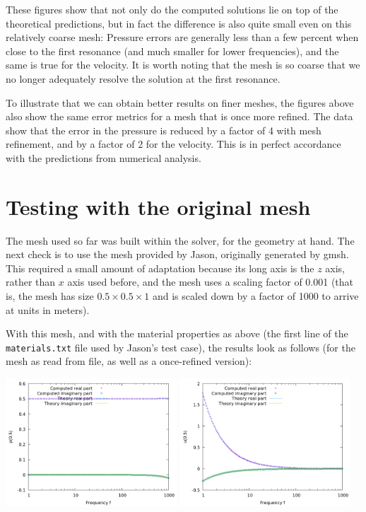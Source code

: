\documentclass{article}
\begin{document}
These figures show that not only do the computed solutions lie on top
of the theoretical predictions, but in fact the difference is also
quite small even on this relatively coarse mesh: Pressure errors are
generally less than a few percent when close to the first resonance
(and much smaller for lower frequencies), and the
same is true for the velocity. It is worth noting that the mesh is so
coarse that we no longer adequately resolve the solution at the first
resonance.

To illustrate that we can obtain better results on finer meshes, the
figures above also show the same error metrics for a mesh that is once
more refined. The data show that the error in the pressure is reduced
by a factor of 4 with mesh refinement, and by a factor of 2 for the
velocity. This is in perfect accordance with the predictions from
numerical analysis.


\section{Testing with the original mesh}

The mesh used so far was built within the solver, for the geometry at
hand. The next check is to use the mesh provided by Jason, originally
generated by gmsh. This required a small amount of adaptation because
its long axis is the $z$ axis, rather than $x$ axis used before, and
the mesh uses a scaling factor of 0.001 (that is, the mesh has size
$0.5\times 0.5\times 1$ and is scaled down by a factor of 1000 to
arrive at units in meters).

With this mesh, and with the material properties as above (the first
line of the \texttt{materials.txt} file used by Jason's test case),
the results look as follows (for the mesh as read from file, as well
as a once-refined version):
\begin{center}
\includegraphics[width=0.48\textwidth]{wave-guide-tet-real-material-jasons-mesh-0/pressure-at-center.png}
\includegraphics[width=0.48\textwidth]{wave-guide-tet-real-material-jasons-mesh-0/velocity-at-center.png}
\end{center}
\end{document}

